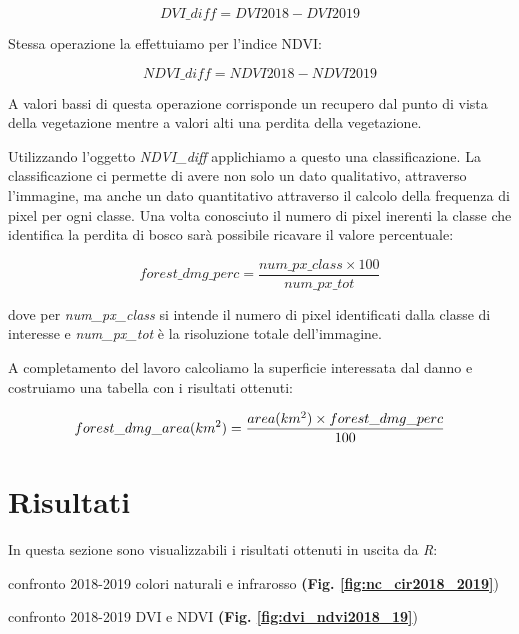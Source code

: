 \documentclass[a4paper,12pt]{article}
\begin{document}
\begin{equation}
    DVI\_diff = {DVI2018 -  DVI2019}
    \label{eq:DVI}
\end{equation}

Stessa operazione la effettuiamo per l'indice NDVI:

\begin{equation}
    NDVI\_diff = {NDVI2018 -  NDVI2019}
    \label{eq:NDVI}
\end{equation}

A valori bassi di questa operazione corrisponde un recupero dal punto di vista della vegetazione mentre a valori alti una perdita della vegetazione. 

Utilizzando l'oggetto \textit{NDVI\_diff} applichiamo a questo una classificazione. La classificazione ci permette di avere non solo un dato qualitativo, attraverso l'immagine, ma anche un dato quantitativo attraverso il calcolo della frequenza di pixel per ogni classe. Una volta conosciuto il numero di pixel inerenti la classe che identifica la perdita di bosco sarà possibile ricavare il valore percentuale:

\begin{equation}
    forest\_dmg\_perc = \frac{num\_px\_class \times 100}{num\_px\_tot}
    \label{eq:forest_dmg_perc}
\end{equation}

dove per \textit{num\_px\_class} si intende il numero di pixel identificati dalla classe di interesse e \textit{num\_px\_tot} è la risoluzione totale dell'immagine.

A completamento del lavoro calcoliamo la superficie interessata dal danno e costruiamo una tabella con i risultati ottenuti:

\begin{equation}
    forest\_dmg\_area(km\textsuperscript{2}) = \frac{area(km\textsuperscript{2}) \times forest\_dmg\_perc}{100}
    \label{eq:forest_area_dmg}
\end{equation}

\section{Risultati}
In questa sezione sono visualizzabili i risultati ottenuti in uscita da \textit{R}:

confronto 2018-2019 colori naturali e infrarosso \textbf{(Fig. \ref{fig:nc_cir2018_2019}})

confronto 2018-2019 DVI e NDVI \textbf{(Fig. \ref{fig:dvi_ndvi2018_19}})
\end{document}
